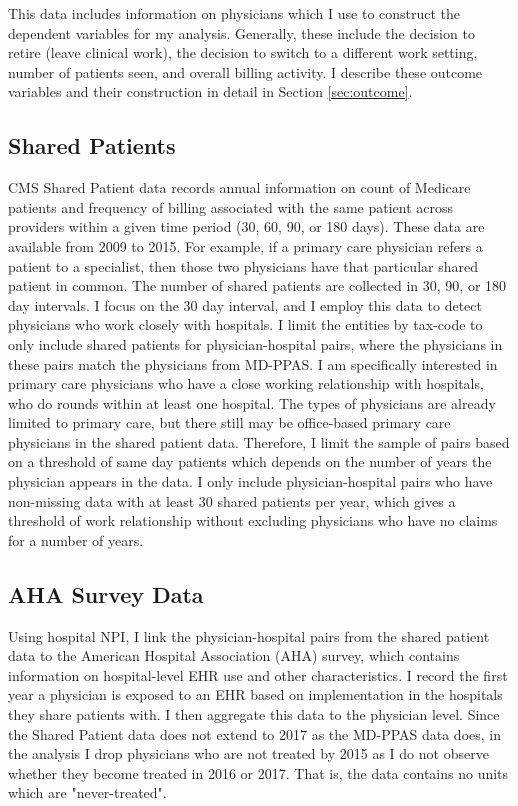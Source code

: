 \documentclass[12pt]{article}
\begin{document}
This data includes information on physicians which I use to construct the dependent variables for my analysis. Generally, these include the decision to retire (leave clinical work), the decision to switch to a different work setting, number of patients seen, and overall billing activity. I describe these outcome variables and their construction in detail in Section \ref{sec:outcome}.


\subsection{Shared Patients}

CMS Shared Patient data records annual information on count of Medicare patients and frequency of billing associated with the same patient across providers within a given time period (30, 60, 90, or 180 days). These data are available from 2009 to 2015. For example, if a primary care physician refers a patient to a specialist, then those two physicians have that particular shared patient in common. The number of shared patients are collected in 30, 90, or 180 day intervals. I focus on the 30 day interval, and I employ this data to detect physicians who work closely with hospitals. I limit the entities by tax-code to only include shared patients for physician-hospital pairs, where the physicians in these pairs match the physicians from MD-PPAS. I am specifically interested in primary care physicians who have a close working relationship with hospitals, who do rounds within at least one hospital. The types of physicians are already limited to primary care, but there still may be office-based primary care physicians in the shared patient data. Therefore, I limit the sample of pairs based on a threshold of same day patients which depends on the number of years the physician appears in the data. I only include physician-hospital pairs who have non-missing data with at least 30 shared patients per year, which gives a threshold of work relationship without excluding physicians who have no claims for a number of years.

\subsection{AHA Survey Data}

Using hospital NPI, I link the physician-hospital pairs from the shared patient data to the American Hospital Association (AHA) survey, which contains information on hospital-level EHR use and other characteristics. I record the first year a physician is exposed to an EHR based on implementation in the hospitals they share patients with. I then aggregate this data to the physician level. Since the Shared Patient data does not extend to 2017 as the MD-PPAS data does, in the analysis I drop physicians who are not treated by 2015 as I do not observe whether they become treated in 2016 or 2017. That is, the data contains no units which are "never-treated".
\end{document}
